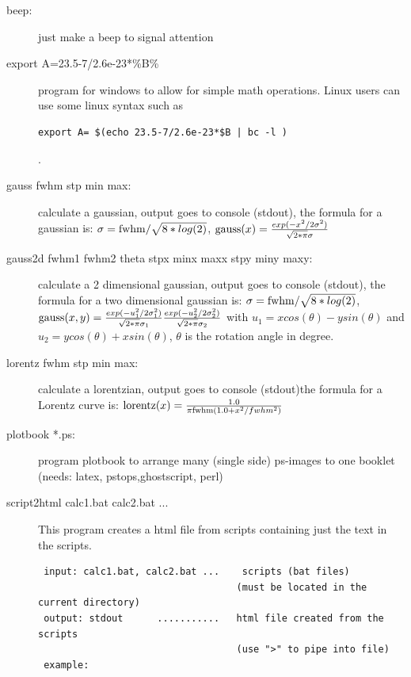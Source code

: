 \begin{description}
\item [\prg beep:] just make a beep to signal attention 
\item [\prg export A=23.5-7/2.6e-23*\%B\%] program for windows to allow for
simple math operations. Linux users can use some linux syntax such as 
{\prg \begin{verbatim}export A= $(echo 23.5-7/2.6e-23*$B | bc -l )\end{verbatim}}.
\item [\prg gauss fwhm stp min max:] calculate a gaussian, output goes to console %
(stdout), the formula for a gaussian is:
$\sigma={\rm fwhm}/\sqrt{8*log(2)}$,
${\rm gauss}(x)=\frac{exp(-x^2/2 \sigma^2)}{\sqrt{2*\pi}\sigma}$
\item [\prg gauss2d fwhm1 fwhm2 theta  stpx minx maxx stpy miny maxy:] calculate a 2 dimensional gaussian, output goes to console %
(stdout), the formula for a two dimensional gaussian is:
$\sigma={\rm fwhm}/\sqrt{8*log(2)}$,
${\rm gauss}(x,y)=\frac{exp(-u_1^2/2 \sigma_1^2)}{\sqrt{2*\pi}\sigma_1}\frac{exp(-u_2^2/2 \sigma_2^2)}{\sqrt{2*\pi}\sigma_2}$ with $u_1=x cos(\theta)-ysin(\theta)$ and $u_2=y cos(\theta)+xsin(\theta)$,
$\theta$ is the rotation angle in degree.
\item [\prg lorentz fwhm stp min max:] calculate a lorentzian, output goes to %
console (stdout)the formula for a Lorentz curve is: 
${\rm lorentz}(x)=\frac{1.0}{\pi{\rm fwhm}(1.0+x^2/fwhm^2)}$
\item [\prg plotbook *.ps:] program plotbook to arrange many (single side) ps-images to one %
booklet (needs: latex, pstops,ghostscript, perl)
\item [\prg script2html calc1.bat calc2.bat ...] This program creates a html file from scripts containing just the text
 in the scripts.
\begin{verbatim}
 input: calc1.bat, calc2.bat ...    scripts (bat files)
                                   (must be located in the current directory)
 output: stdout      ...........   html file created from the scripts
                                   (use ">" to pipe into file)
 example:


\end{verbatim}
\end{description}
